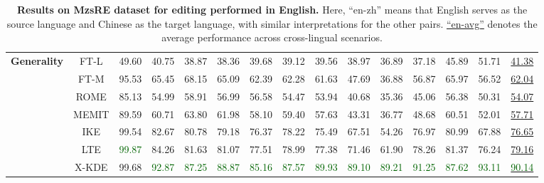 \begin{table*}[!h]
{\begin{tabular}{ccccccccccccccc}
           \midrule
            \multirow{7}{*}{\textbf{Generality}} 
            & FT-L &  49.60 &  40.75 &  38.87 &  38.36 &  39.68 &  39.12 &  39.56 &  38.97 &  36.89 &  37.18 &  45.89 &  51.71 &  \underline{41.38} \\
            & FT-M &  95.53 &  65.45 &  68.15 &  65.09 &  62.39 &  62.28 &  61.63 &  47.69 &  36.88 &  56.87 &  65.97 &  56.52 &  \underline{62.04} \\
            & ROME &  85.13 &  54.99 &  58.91 &  56.99 &  56.58 &  54.47 &  53.94 &  40.68 &  35.36 &  45.06 &  56.38 &  50.31 &  \underline{54.07} \\
            & MEMIT &  89.59 &  60.71 &  63.80 &  61.98 &  58.10 &  59.40 &  57.63 &  43.31 &  36.77 &  48.68 &  60.51 &  52.01 &  \underline{57.71} \\
            & IKE & 99.54 & 82.67 & 80.78 & 79.18 & 76.37 & 78.22 & 75.49 & 67.51 & 54.26 & 76.97 & 80.99 & 67.88 & \underline{76.65} \\
            & LTE & \textcolor{darkgreen}{99.87} & 84.26 & 81.63 & 81.07 & 77.51 & 78.99 & 77.38 & 71.46 & 61.90 & 78.26 & 81.37 & 76.24 & \underline{79.16} \\
           \cmidrule{2-15}
           & X-KDE & 99.68 & \textcolor{darkgreen}{92.87} & \textcolor{darkgreen}{87.25} & \textcolor{darkgreen}{88.87} & \textcolor{darkgreen}{85.16} & \textcolor{darkgreen}{87.57} & \textcolor{darkgreen}{89.93} & \textcolor{darkgreen}{89.10} & \textcolor{darkgreen}{89.21} & \textcolor{darkgreen}{91.25} & \textcolor{darkgreen}{87.62} & \textcolor{darkgreen}{93.11} & \underline{\textcolor{darkgreen}{90.14}} \\

           \bottomrule
        \end{tabular}
    }
    \caption{
    \textbf{Results on MzsRE dataset for editing performed in English.} Here, ``en-zh'' means that English serves as the source language and Chinese as the target language, with similar interpretations for the other pairs. \underline{``en-avg''} denotes the average performance across cross-lingual scenarios.}
    \label{tab:en-edit}
\end{table*}




